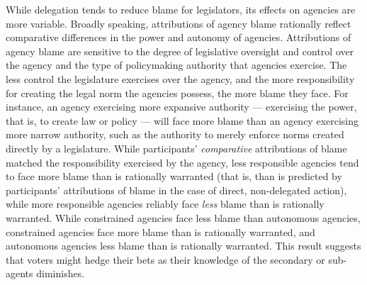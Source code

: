 \documentclass{article}
\begin{document}
While delegation tends to reduce blame for legislators, its effects on agencies are more variable. Broadly speaking, attributions of agency blame rationally reflect comparative differences in the power and autonomy of agencies. Attributions of agency blame are sensitive to the degree of legislative oversight and control over the agency and the type of policymaking authority that agencies exercise. The less control the legislature exercises over the agency, and the more responsibility for creating the legal norm the agencies possess, the more blame they face. For instance, an agency exercising more expansive authority --- exercising the power, that is, to create law or policy --- will face more blame than an agency exercising more narrow authority, such as the authority to merely enforce norms created directly by a legislature. While participants' \emph{comparative} attributions of blame matched the responsibility exercised by the agency, less responsible agencies tend to face more blame than is rationally warranted (that is, than is predicted by participants' attributions of blame in the case of direct, non-delegated action), while more responsible agencies reliably face \emph{less} blame than is rationally warranted. While constrained agencies face less blame than autonomous agencies, constrained agencies face more blame than is rationally warranted, and autonomous agencies less blame than is rationally warranted. This result suggests that voters might hedge their bets as their knowledge of the secondary or sub-agents diminishes.
\end{document}
